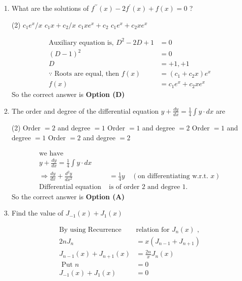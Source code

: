 \begin{enumerate}[label=\color{ocre}\textbf{\arabic*.}]
\item What are the solutions of $f^{\prime \prime}(x)-2 f^{\prime}(x)+f(x)=0$ ?
 \begin{tasks}(2)
	\task[\textbf{A.}]$c_{1} e^{x} / x$
	\task[\textbf{B.}]$c_{1} x+c_{2} / x$
	\task[\textbf{C.}] $c_{1} x e^{x}+c_{2}$
	\task[\textbf{D.}]  $c_{1} e^{x}+c_{2} x e^{x}$
\end{tasks}
\begin{answer}
	$$
	\begin{aligned}
	 \text{Auxiliary equation is, } D^{2}-2 D+1&=0 \\ (D-1)^{2}&=0 \\ D&=+1, +1\\
	\because\text{ Roots are equal, then }f(x)&=\left(c_{1}+c_{2} x\right) e^{x} \\ f(x)&=c_{1} e^{x}+c_{2} x e^{x}
	\end{aligned}
	$$
	So the correct answer is \textbf{Option (D)}
\end{answer}


\item The order and degree of the differential equation $y+\frac{d y}{d x}=\frac{1}{4} \int y \cdot d x$ are
 \begin{tasks}(2)
	\task[\textbf{a.}]Order $=2$ and degree $=1$
	\task[\textbf{b.}]Order $=1$ and degree $=2$
	\task[\textbf{c.}]Order $=1$ and degree $=1$
	\task[\textbf{d.}]Order $=2$ and degree $=2$ 
\end{tasks}
\begin{answer}
	$$
	\begin{aligned}
	\text{we have}\\
	y+\frac{d y}{d x}=\frac{1}{4} \int y \cdot d x \\
	\Rightarrow \frac{d y}{d x}+\frac{d^{2} y}{d x^{2}}&=\frac{1}{4} y\quad ( \text{on differentiating w.r.t. }x)\\
	\text{Differential equation }&\text{is of order 2 and degree 1.}
	\end{aligned}
	$$
	So the correct answer is \textbf{Option (A)}
\end{answer}


\item Find the value of $J_{-1}(x)+J_{1}(x)$
\begin{answer}
	$$
	\begin{aligned}
	\text{By using Recurrence }&\text{relation  for $J_{n}(x)$ ,}\\
		2 n J_{n}&=x \left(J_{n-1}+J_{n+1}\right) \\
		J_{n-1}(x)+J_{n+1}(x) &=\frac{2 n}{x} J_{n}(x) \\
		\text { Put } n &=0 \\
		J_{-1}(x)+J_{1}(x) &=0
	\end{aligned}
	$$
\end{answer}


\end{enumerate}
